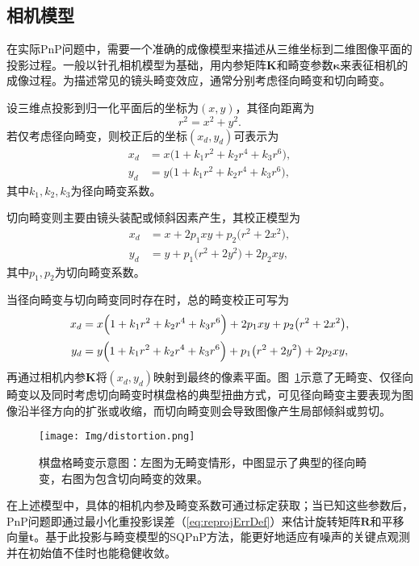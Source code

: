 \subsection{相机模型}
在实际PnP问题中，需要一个准确的成像模型来描述从三维坐标到二维图像平面的投影过程。一般以针孔相机模型为基础，用内参矩阵$\mathbf{K}$和畸变参数$\boldsymbol{\kappa}$来表征相机的成像过程。为描述常见的镜头畸变效应，通常分别考虑径向畸变和切向畸变。

设三维点投影到归一化平面后的坐标为$(x,y)$，其径向距离为
\[
r^2 = x^2 + y^2.
\]
若仅考虑径向畸变，则校正后的坐标$(x_{d},y_{d})$可表示为
\[
\begin{aligned}
	x_{d} &= x\bigl(1 + k_1r^2 + k_2r^4 + k_3r^6\bigr),\\[2pt]
	y_{d} &= y\bigl(1 + k_1r^2 + k_2r^4 + k_3r^6\bigr),
\end{aligned}
\]
其中$k_1, k_2, k_3$为径向畸变系数。

切向畸变则主要由镜头装配或倾斜因素产生，其校正模型为
\[
\begin{aligned}
	x_{d} &= x + 2p_1 xy + p_2\bigl(r^2 + 2x^2\bigr),\\[2pt]
	y_{d} &= y + p_1\bigl(r^2 + 2y^2\bigr) + 2p_2 xy,
\end{aligned}
\]
其中$p_1, p_2$为切向畸变系数。

当径向畸变与切向畸变同时存在时，总的畸变校正可写为
\begin{equation}
	\begin{aligned}
		x_{d} &= x\Bigl(1 + k_1r^2 + k_2r^4 + k_3r^6\Bigr)
		+ 2p_1 xy + p_2\bigl(r^2 + 2x^2\bigr),\\[2pt]
		y_{d} &= y\Bigl(1 + k_1r^2 + k_2r^4 + k_3r^6\Bigr)
		+ p_1\bigl(r^2 + 2y^2\bigr) + 2p_2 xy,
	\end{aligned}
	\label{eq:comprehensive_distortion}
\end{equation}
再通过相机内参$\mathbf{K}$将$(x_{d},y_{d})$映射到最终的像素平面。图~\ref{fig:distortion_patterns}示意了无畸变、仅径向畸变以及同时考虑切向畸变时棋盘格的典型扭曲方式，可见径向畸变主要表现为图像沿半径方向的扩张或收缩，而切向畸变则会导致图像产生局部倾斜或剪切。

\begin{figure}[htbp]
	\centering
	\texttt{[image: Img/distortion.png]}
	\caption{棋盘格畸变示意图：左图为无畸变情形，中图显示了典型的径向畸变，右图为包含切向畸变的效果。}
	\label{fig:distortion_patterns}
\end{figure}

在上述模型中，具体的相机内参及畸变系数可通过标定获取；当已知这些参数后，PnP问题即通过最小化重投影误差（\ref{eq:reprojErrDef}）来估计旋转矩阵$\mathbf{R}$和平移向量$\mathbf{t}$。基于此投影与畸变模型的SQPnP方法，能更好地适应有噪声的关键点观测并在初始值不佳时也能稳健收敛。


